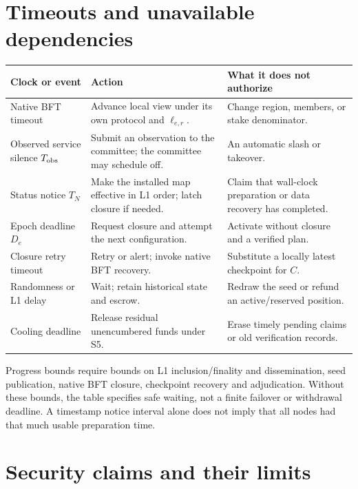 \documentclass[11pt,a4paper]{article}
\begin{document}
\section{Timeouts and unavailable dependencies}
\label{sec:timeouts}

\begin{tabularx}{\linewidth}{@{}p{.25\linewidth}Y Y@{}}
\toprule
Clock or event & Action & What it does not authorize\\\midrule
Native BFT timeout & Advance local view under its own protocol and
$\ell_{e,r}$. & Change region, members, or stake denominator.\\
Observed service silence $T_{\rm obs}$ & Submit an observation to the
committee; the committee may schedule off. & An automatic slash or takeover.\\
Status notice $T_N$ & Make the installed map effective in L1 order;
latch closure if needed. & Claim that wall-clock preparation or data recovery
has completed.\\
Epoch deadline $D_e$ & Request closure and attempt the next configuration.
& Activate without closure and a verified plan.\\
Closure retry timeout & Retry or alert; invoke native BFT recovery.
& Substitute a locally latest checkpoint for $C$.\\
Randomness or L1 delay & Wait; retain historical state and escrow.
& Redraw the seed or refund an active/reserved position.\\
Cooling deadline & Release residual unencumbered funds under S5.
& Erase timely pending claims or old verification records.\\\bottomrule
\end{tabularx}

Progress bounds require bounds on L1 inclusion/finality and dissemination,
seed publication, native BFT closure, checkpoint recovery and adjudication.
Without these bounds, the table specifies safe waiting, not a finite
failover or withdrawal deadline. A timestamp notice interval alone does
not imply that all nodes had that much usable preparation time.

\section{Security claims and their limits}
\end{document}
